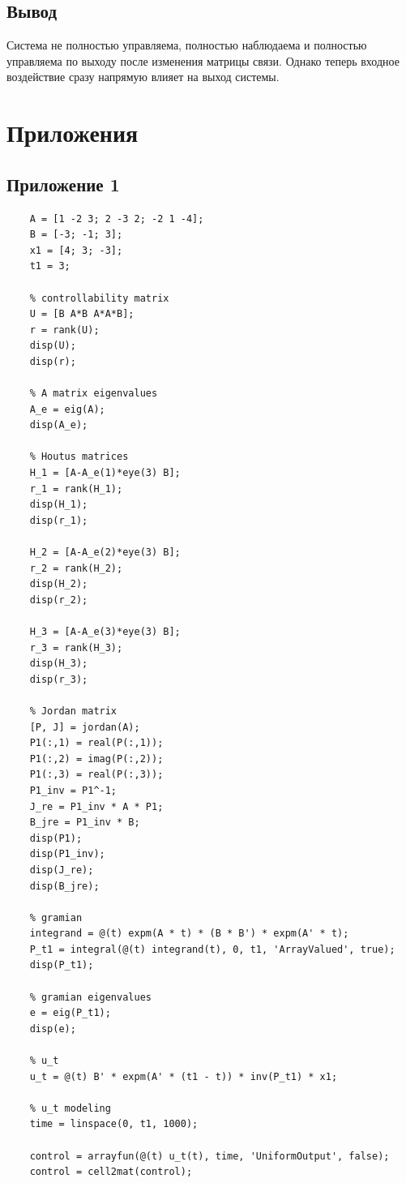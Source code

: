 \documentclass[a4paper, 12pt]{article}
\begin{document}
    \subsection{Вывод}
    Система не полностью управляема, полностью наблюдаема и полностью управляема по выходу после изменения матрицы связи.
    Однако теперь входное воздействие сразу напрямую влияет на выход системы.
    \vfill


    \section{Приложения}
    \subsection{Приложение 1}
    \begin{lstlisting}[label=task1, caption={Программа для первого задания}]
    % input data
    A = [1 -2 3; 2 -3 2; -2 1 -4];
    B = [-3; -1; 3];
    x1 = [4; 3; -3];
    t1 = 3;

    % controllability matrix
    U = [B A*B A*A*B];
    r = rank(U);
    disp(U);
    disp(r);

    % A matrix eigenvalues
    A_e = eig(A);
    disp(A_e);

    % Houtus matrices
    H_1 = [A-A_e(1)*eye(3) B];
    r_1 = rank(H_1);
    disp(H_1);
    disp(r_1);

    H_2 = [A-A_e(2)*eye(3) B];
    r_2 = rank(H_2);
    disp(H_2);
    disp(r_2);

    H_3 = [A-A_e(3)*eye(3) B];
    r_3 = rank(H_3);
    disp(H_3);
    disp(r_3);

    % Jordan matrix
    [P, J] = jordan(A);
    P1(:,1) = real(P(:,1));
    P1(:,2) = imag(P(:,2));
    P1(:,3) = real(P(:,3));
    P1_inv = P1^-1; 
    J_re = P1_inv * A * P1;
    B_jre = P1_inv * B;
    disp(P1);
    disp(P1_inv);
    disp(J_re);
    disp(B_jre);

    % gramian
    integrand = @(t) expm(A * t) * (B * B') * expm(A' * t);
    P_t1 = integral(@(t) integrand(t), 0, t1, 'ArrayValued', true);
    disp(P_t1);

    % gramian eigenvalues
    e = eig(P_t1);
    disp(e);

    % u_t
    u_t = @(t) B' * expm(A' * (t1 - t)) * inv(P_t1) * x1;

    % u_t modeling
    time = linspace(0, t1, 1000);

    control = arrayfun(@(t) u_t(t), time, 'UniformOutput', false);
    control = cell2mat(control);


\end{lstlisting}
\end{document}
